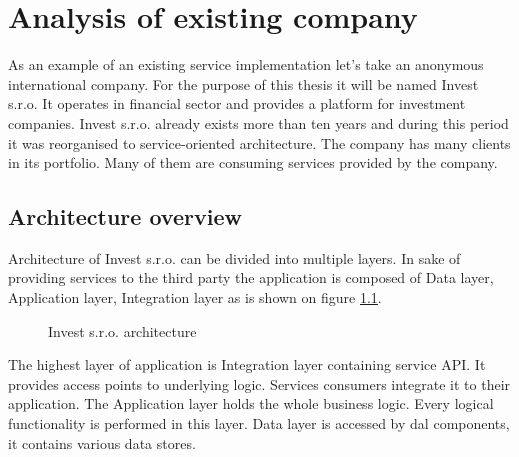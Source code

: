 \chapter{Analysis of existing company}

As an example of an existing service implementation let's take an anonymous international company. For the purpose of this thesis it will be named Invest s.r.o. It operates in financial sector and provides a platform for investment companies. Invest s.r.o. already exists more than ten years and during this period it was reorganised to service-oriented architecture. The company has many clients in its portfolio. Many of them are consuming services provided by the company.

\section{Architecture overview}
Architecture of Invest s.r.o. can be divided into multiple layers. In sake of providing services to the third party the application is composed of Data layer, Application layer, Integration layer as is shown on figure \ref{fig:invest-architecture}.

\begin{figure}[htp] 
\caption{Invest s.r.o. architecture}
\label{fig:invest-architecture}
\end{figure} 

The highest layer of application is Integration layer containing service API. It provides access points to underlying logic. Services consumers integrate it to their application. The Application layer holds the whole business logic. Every logical functionality is performed in this layer. Data layer is accessed by \gls{dal} components, it contains various data stores.


